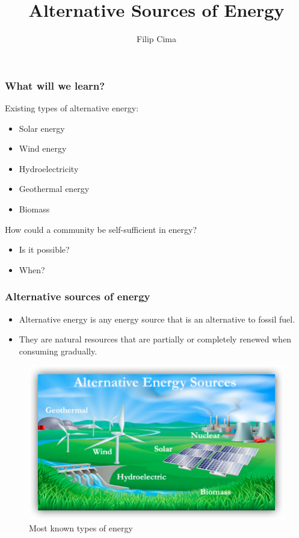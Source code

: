 \documentclass[usepdftitle=true]{beamer}
\author{Filip Cima}
\title{Alternative Sources of Energy}
\institute{VŠB - TUO}
\begin{document}
\frame{\titlepage}

\begin{frame}[<+->]
	\frametitle{What will we learn?}
	Existing types of alternative energy:
	\begin{itemize}[<+->]
		\item Solar energy	
		\item Wind energy
	 	\item Hydroelectricity
		\item Geothermal energy
		\item Biomass
	\end{itemize}
	How could a community be self-sufficient in energy?
	\begin{itemize}
		\item Is it possible?
		\item When?
	\end{itemize}
\end{frame}

\begin{frame}
	\frametitle{Alternative sources of energy}
	\begin{itemize}[<+->]
		\item Alternative energy is any energy source that is an alternative to fossil fuel.
		\item They are natural resources that are partially or completely renewed when consuming gradually.
	\end{itemize}
	\begin{figure}
		\includegraphics[scale=0.38]{img/typesofenergy.png}
	\caption{Most known types of energy}
	\end{figure}
\end{frame}
\end{document}
